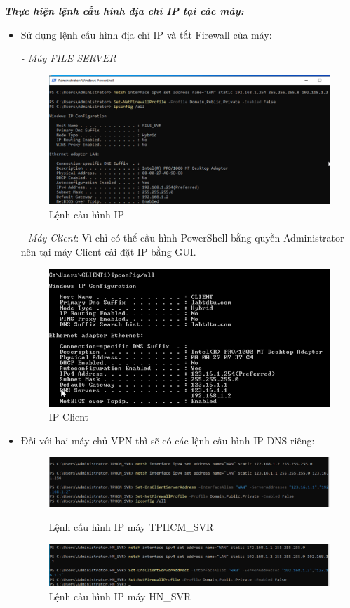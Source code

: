 \textbf{\textit{Thực hiện lệnh cấu hình địa chỉ IP tại các máy:}}
\begin{itemize}
    \item Sử dụng lệnh cấu hình địa chỉ IP và tắt Firewall của máy:

    \textit{- Máy FILE SERVER}\\
     \begin{figure}[htbp]
            \centering
            \includegraphics[width=0.5\linewidth]{SiteToSiteImg/ipFILE.png}
            \caption{Lệnh cấu hình IP}
        \end{figure}
        
    \textit{- Máy Client}: Vì chỉ có thể cấu hình PowerShell bằng quyền Administrator nên tại máy Client cài đặt IP bằng GUI.
     \begin{figure}[htbp]
            \centering
            \includegraphics[width=0.5\linewidth]{SiteToSiteImg/ipClient.png}
            \caption{IP Client}
        \end{figure}
    \newpage
    \item Đối với hai máy chủ VPN thì sẽ có các lệnh cấu hình IP DNS riêng:
    \begin{figure}[htbp]
        \centering
        \includegraphics[width=0.7\linewidth]{SiteToSiteImg/ipSG.png}
        \caption{Lệnh cấu hình IP máy TPHCM\_SVR}
        \vspace{2em}
        \includegraphics[width=0.7\linewidth]{SiteToSiteImg/iphn.png}
        \caption{Lệnh cấu hình IP máy HN\_SVR}
    \end{figure}
\end{itemize}
 
